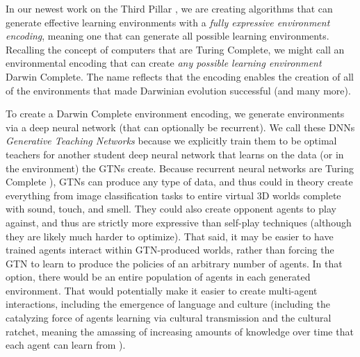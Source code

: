 \documentclass{article}
\begin{document}
In our newest work on the Third Pillar \cite{petroskisuch2019GTN}, we are creating algorithms that can generate effective learning environments with a \emph{fully expressive environment encoding}, meaning one that can generate all possible learning environments. Recalling the concept of computers that are Turing Complete, we might call an environmental encoding that can create \emph{any possible learning environment} Darwin Complete. The name reflects that the encoding enables the creation of all of the environments that made Darwinian evolution successful (and many more). 

To create a Darwin Complete environment encoding, we generate environments via a deep neural network (that can optionally be recurrent). We call these DNNs \emph{Generative Teaching Networks} \cite{petroskisuch2019GTN} because we explicitly train them to be optimal teachers for another student deep neural network that learns on the data (or in the environment) the GTNs create. Because recurrent neural networks are Turing Complete \cite{siegelmann1995computational}), GTNs can produce any type of data, and thus could in theory create everything from image classification tasks to entire virtual 3D worlds complete with sound, touch, and smell. They could also create opponent agents to play against, and thus are strictly more expressive than self-play techniques (although they are likely much harder to optimize). That said, it may be easier to have trained agents interact within GTN-produced worlds, rather than forcing the GTN to learn to produce the policies of an arbitrary number of agents.
In that option, there would be an entire population of agents in each generated environment. That would potentially make it easier to create multi-agent interactions, including the emergence of language and culture (including the catalyzing force of agents learning via cultural transmission and the cultural ratchet, meaning the amassing of increasing amounts of knowledge over time that each agent can learn from \cite{tomasello2009cultural}).
\end{document}
